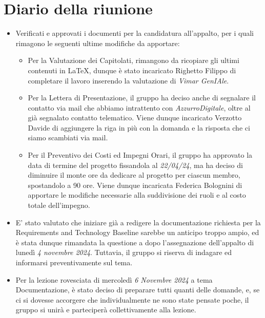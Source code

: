 \section{Diario della riunione}

\begin{itemize}
    \item Verificati e approvati i documenti per la candidatura all'appalto, per i quali rimagono le seguenti ultime modifiche da apportare:
    \begin{itemize}
      \renewcommand{\labelitemii}{--}
      \item Per la Valutazione dei Capitolati, rimangono da ricopiare gli ultimi contenuti in LaTeX, dunque è stato
            incaricato Righetto Filippo di completare il lavoro inserendo la valutazione di \emph{Vimar GenIAle}.
      \item Per la Lettera di Presentazione, il gruppo ha deciso anche di segnalare il contatto via mail che abbiamo intrattento con \emph{AzzurroDigitale}, 
            oltre al già segnalato contatto telematico. Viene dunque incaricato Verzotto Davide di aggiungere la riga in più con la domanda e la risposta
            che ci siamo scambiati via mail.
      \item Per il Preventivo dei Costi ed Impegni Orari, il gruppo ha approvato la data di termine del progetto fissandola al \emph{22/04/24}, 
            ma ha deciso di diminuire il monte ore da dedicare al progetto per ciascun membro, spostandolo a 90 ore. Viene dunque incaricata Federica 
            Bolognini di apportare le modifiche necessarie alla suddivisione dei ruoli e al costo totale dell'impegno.
    \end{itemize}
    \item E' stato valutato che iniziare già a redigere la documentazione richiesta per la Requirements and Technology Baseline sarebbe un anticipo troppo
          ampio, ed è stata dunque rimandata la questione a dopo l'assegnazione dell'appalto di lunedì \emph{4 novembre 2024}. Tuttavia, il gruppo si riserva
          di indagare ed informarsi preventivamente sul tema.
    \item Per la lezione rovesciata di mercoledì \emph{6 Novembre 2024} a tema Documentazione, è stato deciso di preparare tutti quanti delle domande, e, 
          se ci si dovesse accorgere che individualmente ne sono state pensate poche, il gruppo si unirà e parteciperà collettivamente alla lezione.
\end{itemize}



